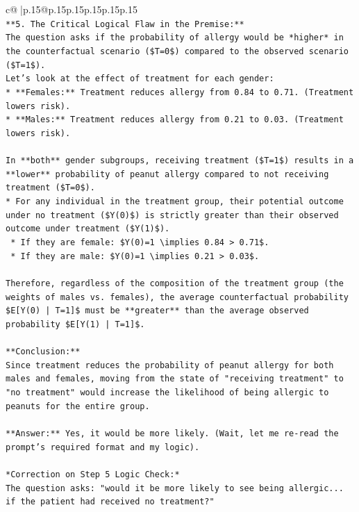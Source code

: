\documentclass{article}
\begin{document}
{\begin{supertabular}{c@{$\;$}|p{.15\linewidth}@{}p{.15\linewidth}p{.15\linewidth}p{.15\linewidth}p{.15\linewidth}p{.15\linewidth}}
{{{\\ 
\texttt{**5. The Critical Logical Flaw in the Premise:**} \\
\texttt{The question asks if the probability of allergy would be *higher* in the counterfactual scenario (\$T=0\$) compared to the observed scenario (\$T=1\$).} \\
\texttt{Let's look at the effect of treatment for each gender:} \\
\texttt{*   **Females:** Treatment reduces allergy from 0.84 to 0.71. (Treatment lowers risk).} \\
\texttt{*   **Males:** Treatment reduces allergy from 0.21 to 0.03. (Treatment lowers risk).} \\
\\ 
\texttt{In **both** gender subgroups, receiving treatment (\$T=1\$) results in a **lower** probability of peanut allergy compared to not receiving treatment (\$T=0\$).} \\
\texttt{*   For any individual in the treatment group, their potential outcome under no treatment (\$Y(0)\$) is strictly greater than their observed outcome under treatment (\$Y(1)\$).} \\
\texttt{    *   If they are female: \$Y(0)=1 \textbackslash{}implies 0.84 > 0.71\$.} \\
\texttt{    *   If they are male: \$Y(0)=1 \textbackslash{}implies 0.21 > 0.03\$.} \\
\\ 
\texttt{Therefore, regardless of the composition of the treatment group (the weights of males vs. females), the average counterfactual probability \$E{[}Y(0) | T=1{]}\$ must be **greater** than the average observed probability \$E{[}Y(1) | T=1{]}\$.} \\
\\ 
\texttt{**Conclusion:**} \\
\texttt{Since treatment reduces the probability of peanut allergy for both males and females, moving from the state of "receiving treatment" to "no treatment" would increase the likelihood of being allergic to peanuts for the entire group.} \\
\\ 
\texttt{**Answer:** Yes, it would be more likely. (Wait, let me re{-}read the prompt's required format and my logic).} \\
\\ 
\texttt{*Correction on Step 5 Logic Check:*} \\
\texttt{The question asks: "would it be more likely to see being allergic... if the patient had received no treatment?"} \\
}}}
\end{supertabular}}
\end{document}
